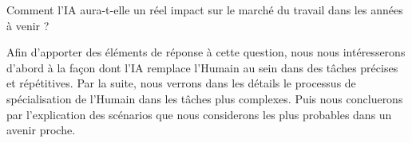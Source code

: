 Comment l'IA aura-t-elle un réel impact sur le marché du travail dans les années à venir ?

Afin d'apporter des éléments de réponse à cette question, nous nous intéresserons d'abord à la façon dont l'IA remplace l'Humain au sein dans des tâches précises et répétitives.
Par la suite, nous verrons dans les détails le processus de spécialisation de l'Humain dans les tâches plus complexes.
Puis nous concluerons par l'explication des scénarios que nous considerons les plus probables dans un avenir proche.
